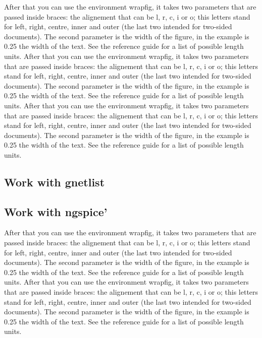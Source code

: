 \documentclass{report}
\begin{document}
		
		
		
		
		After that you can use the environment wrapfig, it takes two parameters that are passed inside braces: the alignement that can be l, r, c, i or o; this letters stand for left, right, centre, inner and outer (the last two intended for two-sided documents). The second parameter is the width of the figure, in the example is 0.25 the width of the text. See the reference guide for a list of possible length units.
		After that you can use the environment wrapfig, it takes two parameters that are passed inside braces: the alignement that can be l, r, c, i or o; this letters stand for left, right, centre, inner and outer (the last two intended for two-sided documents). The second parameter is the width of the figure, in the example is 0.25 the width of the text. See the reference guide for a list of possible length units.
		After that you can use the environment wrapfig, it takes two parameters that are passed inside braces: the alignement that can be l, r, c, i or o; this letters stand for left, right, centre, inner and outer (the last two intended for two-sided documents). The second parameter is the width of the figure, in the example is 0.25 the width of the text. See the reference guide for a list of possible length units. \cite{firstRef,thirdRef}
		
		
		
		
		\subsection{ Work with gnetlist}
		
		
		
		\subsection{Work with ngspice’}
		After that you can use the environment wrapfig, it takes two parameters that are passed inside braces: the alignement that can be l, r, c, i or o; this letters stand for left, right, centre, inner and outer (the last two intended for two-sided documents). The second parameter is the width of the figure, in the example is 0.25 the width of the text. See the reference guide for a list of possible length units.
		After that you can use the environment wrapfig, it takes two parameters that are passed inside braces: the alignement that can be l, r, c, i or o; this letters stand for left, right, centre, inner and outer (the last two intended for two-sided documents). The second parameter is the width of the figure, in the example is 0.25 the width of the text. See the reference guide for a list of possible length units. \cite{firstRef,thirdRef}
		
\end{document}
